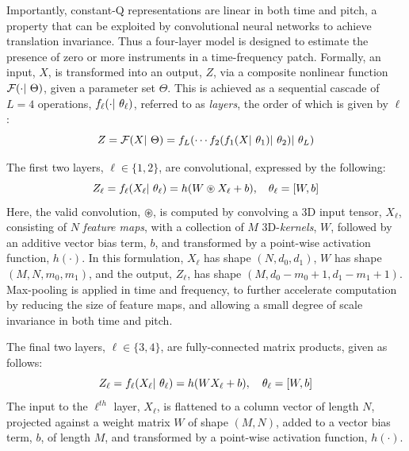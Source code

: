 \documentclass{article}
\begin{document}
Importantly, constant-Q representations are linear in both time and pitch, a property that can be exploited by convolutional neural networks to achieve translation invariance.
Thus a four-layer model is designed to estimate the presence of zero or more instruments in a time-frequency patch.
Formally, an input, $X$, is transformed into an output, $Z$, via a composite nonlinear
function $\mathcal{F}(\cdot |~ \Theta)$, given a parameter set $\Theta$.
This is achieved as a sequential cascade of $L=4$ operations, $f_\ell(\cdot |~
\theta_\ell)$, referred to as \emph{layers}, the order of which is given by $\ell$:
\begin{equation}
\label{eq:layers}
Z = \mathcal{F}(X |~ \Theta) = f_{L}(  \cdots f_2(f_1(X |~ \theta_1) |~ \theta_2) |~ \theta_{L})
\end{equation}

The first two layers, $\ell \in \{1, 2\}$, are convolutional, expressed by the following:
\begin{equation}
\label{eq:convlayer}
\small
Z_\ell = f_\ell(X_\ell \given \theta_\ell) = h(W \circledast X_\ell + b), \quad
\theta_\ell = [W, b]
\end{equation}
Here, the valid convolution, $\circledast$, is computed by convolving a 3D input tensor,
$X_\ell$, consisting of $N$ \emph{feature maps}, with a collection of $M$ 3D-\emph{kernels}, $W$, followed by an additive vector bias term, $b$, and transformed by a point-wise activation function, $h(\cdot)$.
In this formulation, $X_\ell$ has shape $(N, d_0, d_1)$, $W$ has shape $(M, N, m_0, m_1)$,
and the output, $Z_\ell$, has shape $(M, d_0-m_0+1, d_1-m_1+1)$.
Max-pooling is applied in time and frequency, to further accelerate computation by reducing the size of feature maps, and allowing a small degree of scale invariance in both time and pitch.

The final two layers, $\ell \in \{3, 4\}$, are fully-connected matrix products, given as follows:
\begin{equation}
\label{eq:fclayer}
Z_\ell = f_\ell(X_\ell |~ \theta_\ell) = h( WX_\ell + b), \quad \theta_\ell = [W, b]
\end{equation}
The input to the $\ell^{th}$ layer, $X_\ell$, is flattened to a column vector of length $N$, projected against a weight matrix $W$ of shape $(M, N)$, added to a vector bias term, $b$, of length $M$, and transformed by a point-wise activation function, $h(\cdot)$.
\end{document}
